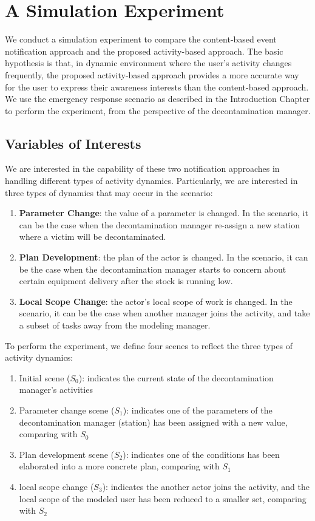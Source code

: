 

\section{A Simulation Experiment} %
\label{sec:a_simulation_experiment}
We conduct a simulation experiment to compare the content-based event notification approach and the proposed activity-based approach. The basic hypothesis is that, in dynamic environment where the user's activity changes frequently, the proposed activity-based approach provides a more accurate way for the user to express their awareness interests than the content-based approach. We use the emergency response scenario as described in the Introduction Chapter to perform the experiment, from the perspective of the decontamination manager.

\subsection{Variables of Interests} %
\label{sub:variables_of_interests}
We are interested in the capability of these two notification approaches in handling different types of activity dynamics. Particularly, we are interested in three types of dynamics that may occur in the scenario: 
\begin{enumerate}
	\item \textbf{Parameter Change}: the value of a parameter is changed. In the scenario, it can be the case when the decontamination manager re-assign a new station where a victim will be decontaminated.
	\item \textbf{Plan Development}: the plan of the actor is changed. In the scenario, it can be the case when the decontamination manager starts to concern about certain equipment delivery after the stock is running low.
	\item \textbf{Local Scope Change}: the actor's local scope of work is changed. In the scenario, it can be the case when another manager joins the activity, and take a subset of tasks away from the modeling manager.  
\end{enumerate}

To perform the experiment, we define four scenes to reflect the three types of activity dynamics:
\begin{enumerate}
	\item Initial scene ($S_0$): indicates the current state of the decontamination manager's activities
	\item Parameter change scene ($S_1$): indicates one of the parameters of the decontamination manager (station) has been assigned with a new value, comparing with $S_0$
	\item Plan development scene ($S_2$): indicates one of the conditions has been elaborated into a more concrete plan, comparing with $S_1$
	\item local scope change ($S_3$): indicates the another actor joins the activity, and the local scope of the modeled user has been reduced to a smaller set, comparing with $S_2$
\end{enumerate}

